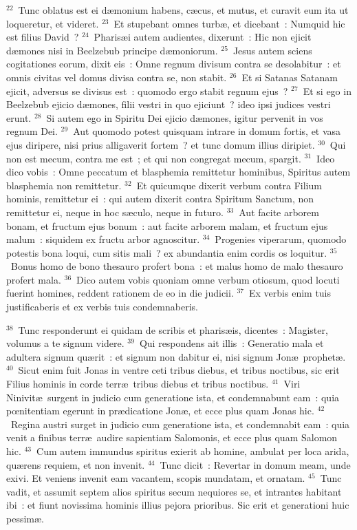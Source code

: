 ${}^{22}$~Tunc oblatus est ei d\ae monium habens, c\ae cus, et mutus, et curavit eum ita ut loqueretur, et videret.
${}^{23}$~Et stupebant omnes turb\ae , et dicebant~: Numquid hic est filius David~?
${}^{24}$~Pharis\ae i autem audientes, dixerunt~: Hic non ejicit d\ae mones nisi in Beelzebub principe d\ae moniorum.
${}^{25}$~Jesus autem sciens cogitationes eorum, dixit eis~: Omne regnum divisum contra se desolabitur~: et omnis civitas vel domus divisa contra se, non stabit.
${}^{26}$~Et si Satanas Satanam ejicit, adversus se divisus est~: quomodo ergo stabit regnum ejus~?
${}^{27}$~Et si ego in Beelzebub ejicio d\ae mones, filii vestri in quo ejiciunt~? ideo ipsi judices vestri erunt.
${}^{28}$~Si autem ego in Spiritu Dei ejicio d\ae mones, igitur pervenit in vos regnum Dei.
${}^{29}$~Aut quomodo potest quisquam intrare in domum fortis, et vasa ejus diripere, nisi prius alligaverit fortem~? et tunc domum illius diripiet.
${}^{30}$~Qui non est mecum, contra me est~; et qui non congregat mecum, spargit.
${}^{31}$~Ideo dico vobis~: Omne peccatum et blasphemia remittetur hominibus, Spiritus autem blasphemia non remittetur.
${}^{32}$~Et quicumque dixerit verbum contra Filium hominis, remittetur ei~: qui autem dixerit contra Spiritum Sanctum, non remittetur ei, neque in hoc s\ae culo, neque in futuro.
${}^{33}$~Aut facite arborem bonam, et fructum ejus bonum~: aut facite arborem malam, et fructum ejus malum~: siquidem ex fructu arbor agnoscitur.
${}^{34}$~Progenies viperarum, quomodo potestis bona loqui, cum sitis mali~? ex abundantia enim cordis os loquitur.
${}^{35}$~Bonus homo de bono thesauro profert bona~: et malus homo de malo thesauro profert mala.
${}^{36}$~Dico autem vobis quoniam omne verbum otiosum, quod locuti fuerint homines, reddent rationem de eo in die judicii.
${}^{37}$~Ex verbis enim tuis justificaberis et ex verbis tuis condemnaberis.


${}^{38}$~Tunc responderunt ei quidam de scribis et pharis\ae is, dicentes~: Magister, volumus a te signum videre.
${}^{39}$~Qui respondens ait illis~: Generatio mala et adultera signum qu\ae rit~: et signum non dabitur ei, nisi signum Jon\ae\ prophet\ae .
${}^{40}$~Sicut enim fuit Jonas in ventre ceti tribus diebus, et tribus noctibus, sic erit Filius hominis in corde terr\ae\ tribus diebus et tribus noctibus.
${}^{41}$~Viri Ninivit\ae\ surgent in judicio cum generatione ista, et condemnabunt eam~: quia pœnitentiam egerunt in pr\ae dicatione Jon\ae , et ecce plus quam Jonas hic.
${}^{42}$~Regina austri surget in judicio cum generatione ista, et condemnabit eam~: quia venit a finibus terr\ae\ audire sapientiam Salomonis, et ecce plus quam Salomon hic.
${}^{43}$~Cum autem immundus spiritus exierit ab homine, ambulat per loca arida, qu\ae rens requiem, et non invenit.
${}^{44}$~Tunc dicit~: Revertar in domum meam, unde exivi. Et veniens invenit eam vacantem, scopis mundatam, et ornatam.
${}^{45}$~Tunc vadit, et assumit septem alios spiritus secum nequiores se, et intrantes habitant ibi~: et fiunt novissima hominis illius pejora prioribus. Sic erit et generationi huic pessim\ae .


